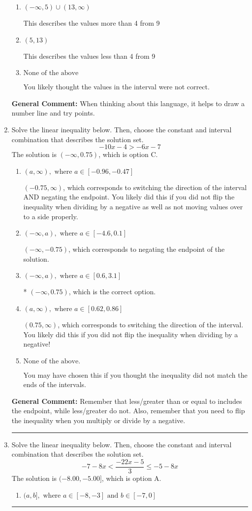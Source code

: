\documentclass{extbook}[14pt]
\newcommand{\litem}[1]{\item #1

\rule{\textwidth}{0.4pt}}
\begin{document}
\begin{enumerate}
{\begin{enumerate}[label=\Alph*.]
This describes the values no less than 4 from 9
\item \( (-\infty, 5) \cup (13, \infty) \)

This describes the values more than 4 from 9
\item \( (5, 13) \)

This describes the values less than 4 from 9
\item \( \text{None of the above} \)

You likely thought the values in the interval were not correct.
\end{enumerate}

\textbf{General Comment:} When thinking about this language, it helps to draw a number line and try points.
}
\litem{
Solve the linear inequality below. Then, choose the constant and interval combination that describes the solution set.
\[ -10x -4 > -6x -7 \]The solution is \( (-\infty, 0.75) \), which is option C.\begin{enumerate}[label=\Alph*.]
\item \( (a, \infty), \text{ where } a \in [-0.96, -0.47] \)

 $(-0.75, \infty)$, which corresponds to switching the direction of the interval AND negating the endpoint. You likely did this if you did not flip the inequality when dividing by a negative as well as not moving values over to a side properly.
\item \( (-\infty, a), \text{ where } a \in [-4.6, 0.1] \)

 $(-\infty, -0.75)$, which corresponds to negating the endpoint of the solution.
\item \( (-\infty, a), \text{ where } a \in [0.6, 3.1] \)

* $(-\infty, 0.75)$, which is the correct option.
\item \( (a, \infty), \text{ where } a \in [0.62, 0.86] \)

 $(0.75, \infty)$, which corresponds to switching the direction of the interval. You likely did this if you did not flip the inequality when dividing by a negative!
\item \( \text{None of the above}. \)

You may have chosen this if you thought the inequality did not match the ends of the intervals.
\end{enumerate}

\textbf{General Comment:} Remember that less/greater than or equal to includes the endpoint, while less/greater do not. Also, remember that you need to flip the inequality when you multiply or divide by a negative.
}
\litem{
Solve the linear inequality below. Then, choose the constant and interval combination that describes the solution set.
\[ -7 - 8 x < \frac{-22 x - 5}{3} \leq -5 - 8 x \]The solution is \( (-8.00, -5.00] \), which is option A.\begin{enumerate}[label=\Alph*.]
\item \( (a, b], \text{ where } a \in [-8, -3] \text{ and } b \in [-7, 0] \)


\end{enumerate}}
\end{enumerate}
\end{document}
